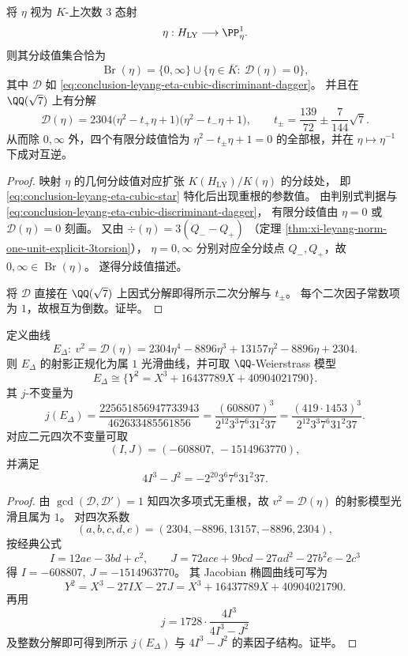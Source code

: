 \begin{theorem}\label{thm:conclusion-leyang-eta-branch-values-explicit}
将 \(\eta\) 视为 \(K\)-上次数 \(3\) 态射
\[
\eta:H_{\mathrm{LY}}\longrightarrow \PP^1_\eta.
\]
则其分歧值集合恰为
\[
\operatorname{Br}(\eta)=\{0,\infty\}\cup\{\eta\in\overline K:\ \mathscr D(\eta)=0\},
\]
其中 \(\mathscr D\) 如 \eqref{eq:conclusion-leyang-eta-cubic-discriminant-dagger}。
并且在 \(\QQ(\sqrt7)\) 上有分解
\[
\mathscr D(\eta)
=2304\bigl(\eta^2-t_+\eta+1\bigr)\bigl(\eta^2-t_-\eta+1\bigr),
\qquad
t_\pm=\frac{139}{72}\pm\frac{7}{144}\sqrt7.
\]
从而除 \(0,\infty\) 外，四个有限分歧值恰为
\(
\eta^2-t_\pm\eta+1=0
\)
的全部根，并在 \(\eta\mapsto\eta^{-1}\) 下成对互逆。
\end{theorem}
\begin{proof}
映射 \(\eta\) 的几何分歧值对应扩张 \(K(H_{\mathrm{LY}})/K(\eta)\) 的分歧处，
即 \eqref{eq:conclusion-leyang-eta-cubic-star} 特化后出现重根的参数值。
由判别式判据与 \eqref{eq:conclusion-leyang-eta-cubic-discriminant-dagger}，
有限分歧值由 \(\eta=0\) 或 \(\mathscr D(\eta)=0\) 刻画。
又由
\(
\div(\eta)=3(Q_--Q_+)
\)
（定理 \ref{thm:xi-leyang-norm-one-unit-explicit-3torsion}），
\(\eta=0,\infty\) 分别对应全分歧点 \(Q_-,Q_+\)，故 \(0,\infty\in\operatorname{Br}(\eta)\)。
遂得分歧值描述。

将 \(\mathscr D\) 直接在 \(\QQ(\sqrt7)\) 上因式分解即得所示二次分解与 \(t_\pm\)。
每个二次因子常数项为 \(1\)，故根互为倒数。证毕。
\end{proof}

\begin{theorem}\label{thm:conclusion-leyang-eta-discriminant-elliptic-j-factorization}
定义曲线
\[
E_\Delta:\ v^2=\mathscr D(\eta)
=2304\eta^4-8896\eta^3+13157\eta^2-8896\eta+2304.
\]
则 \(E_\Delta\) 的射影正规化为属 \(1\) 光滑曲线，并可取 \(\QQ\)-Weierstrass 模型
\[
E_\Delta\cong
\bigl\{Y^2=X^3+16437789X+40904021790\bigr\}.
\]
其 \(j\)-不变量为
\[
j(E_\Delta)
=\frac{225651856947733943}{462633485561856}
=\frac{(608807)^3}{2^{12}3^3 7^6 31^2 37}
=\frac{(419\cdot1453)^3}{2^{12}3^3 7^6 31^2 37}.
\]
对应二元四次不变量可取
\[
(I,J)=(-608807,\,-1514963770),
\]
并满足
\[
4I^3-J^2=-2^{20}3^6 7^6 31^2 37.
\]
\end{theorem}
\begin{proof}
由 \(\gcd(\mathscr D,\mathscr D')=1\) 知四次多项式无重根，故 \(v^2=\mathscr D(\eta)\) 的射影模型光滑且属为 \(1\)。
对四次系数
\[
(a,b,c,d,e)=(2304,-8896,13157,-8896,2304),
\]
按经典公式
\[
I=12ae-3bd+c^2,\qquad
J=72ace+9bcd-27ad^2-27b^2e-2c^3
\]
得
\(
I=-608807,\ J=-1514963770
\)。
其 Jacobian 椭圆曲线可写为
\[
Y^2=X^3-27IX-27J
=X^3+16437789X+40904021790.
\]
再用
\[
j=1728\cdot\frac{4I^3}{4I^3-J^2}
\]
及整数分解即可得到所示 \(j(E_\Delta)\) 与
\(
4I^3-J^2
\)
的素因子结构。证毕。
\end{proof}

